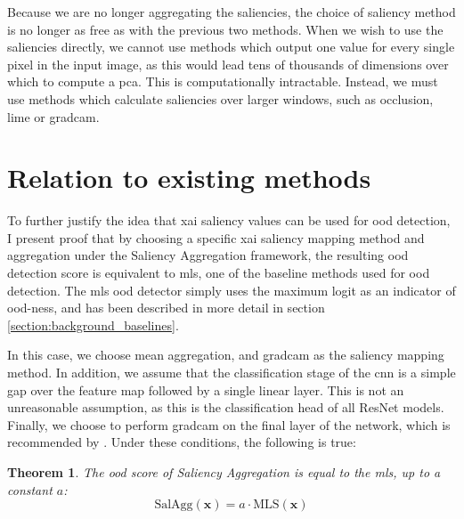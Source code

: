 \documentclass[UKenglish]{uiomasterthesis} %
\newtheorem{theorem}{Theorem}
\theoremstyle{definition}
\begin{document}
\noindent Because we are no longer aggregating the saliencies, the choice of saliency method is no longer as free as with the previous two methods. When we wish to use the saliencies directly, we cannot use methods which output one value for every single pixel in the input image, as this would lead tens of thousands of dimensions over which to compute a \acf{pca}. This is computationally intractable. Instead, we must use methods which calculate saliencies over larger windows, such as occlusion, \ac{lime} or \ac{gradcam}.

\section{Relation to existing methods} \label{section:relation}

To further justify the idea that \ac{xai} saliency values can be used for \ac{ood} detection, I present proof that by choosing a specific \ac{xai} saliency mapping method and aggregation under the Saliency Aggregation framework, the resulting \ac{ood} detection score is equivalent to \ac{mls}, one of the baseline methods used for \ac{ood} detection. The \ac{mls} \ac{ood} detector simply uses the maximum logit as an indicator of \ac{ood}-ness, and has been described in more detail in section \ref{section:background_baselines}.

In this case, we choose mean aggregation, and \ac{gradcam} as the saliency mapping method. In addition, we assume that the classification stage of the \ac{cnn} is a simple \ac{gap} over the feature map followed by a single linear layer. This is not an unreasonable assumption, as this is the classification head of all ResNet models. Finally, we choose to perform \ac{gradcam} on the final layer of the network, which is recommended by \cite{gradcam}. Under these conditions, the following is true:

\begin{theorem} \label{theorem}
The \ac{ood} score of Saliency Aggregation is equal to the \ac{mls}, up to a constant $a$:
\[\text{SalAgg}(\bm{x}) = a \cdot \text{MLS}(\bm{x}) \]
\end{theorem}
\end{document}
